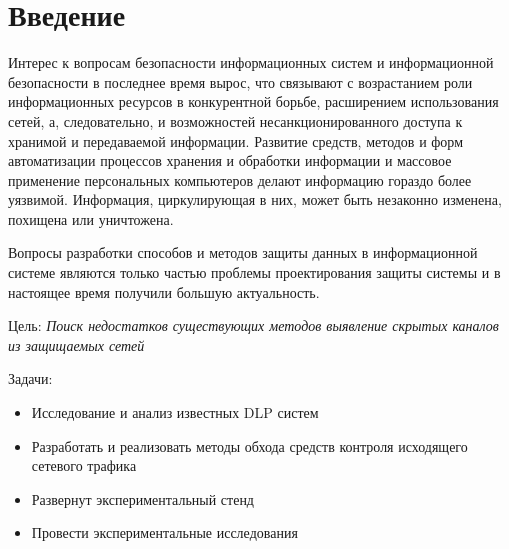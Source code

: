 \chapter*{Введение}

Интерес к вопросам безопасности информационных систем и информационной безопасности в последнее время вырос, что связывают с возрастанием роли информационных ресурсов в конкурентной борьбе, расширением использования сетей, а, следовательно, и возможностей несанкционированного доступа к хранимой и передаваемой информации. Развитие средств, методов и форм автоматизации процессов хранения и обработки информации и массовое применение персональных компьютеров делают информацию гораздо более уязвимой. Информация, циркулирующая в них, может быть незаконно изменена, похищена или уничтожена.

Вопросы разработки способов и методов защиты данных в информационной системе являются только частью проблемы проектирования защиты системы и в настоящее время получили большую актуальность.

Цель: \textit{Поиск недостатков существующих методов выявление скрытых каналов из защищаемых сетей}
	
Задачи:

\begin{itemize}
	\item
		Исследование и анализ известных DLP систем
	\item
		Разработать и реализовать методы обхода средств контроля исходящего сетевого трафика
	\item
		Развернут экспериментальный стенд
	\item
		Провести экспериментальные исследования
\end{itemize}

	